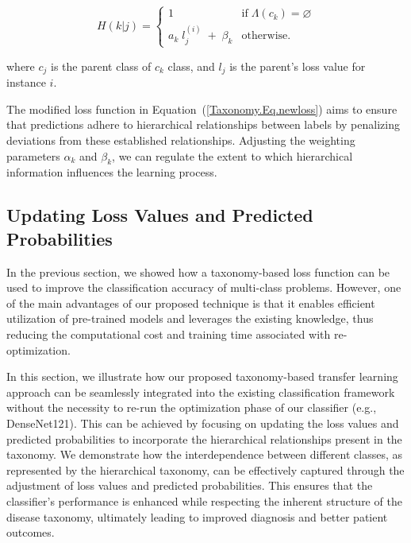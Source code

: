 \begin{equation}
    \label{Taxonomy.Eq.8.hierarchical_penalty.loss}
    H(k\vert j)=\left\{\begin{array}{lc}1&\text{if} \; \Lambda(c_k)=\varnothing\\a_k\;l_j^{(i)}\;+\;\beta_k&\text{otherwise.}\end{array}\right.
\end{equation}

where $c_j $ is the parent class of $c_k $ class, and $l_j $ is the parent's loss value for instance $i $.

The modified loss function in Equation~(\ref{Taxonomy.Eq.newloss})  aims to ensure that predictions adhere to hierarchical relationships between labels by penalizing deviations from these established relationships. Adjusting the weighting parameters $\alpha_k $ and $\beta_k $, we can regulate the extent to which hierarchical information influences the learning process.



\subsection{Updating Loss Values and Predicted Probabilities}

In the previous section, we showed how a taxonomy-based loss function can be used to improve the classification accuracy of multi-class problems. However, one of the main advantages of our proposed technique is that it enables efficient utilization of pre-trained models and leverages the existing knowledge, thus reducing the computational cost and training time associated with re-optimization.

In this section, we illustrate how our proposed taxonomy-based transfer learning approach can be seamlessly integrated into the existing classification framework without the necessity to re-run the optimization phase of our classifier (e.g., DenseNet121). This can be achieved by focusing on updating the loss values and predicted probabilities to incorporate the hierarchical relationships present in the taxonomy. We demonstrate how the interdependence between different classes, as represented by the hierarchical taxonomy, can be effectively captured through the adjustment of loss values and predicted probabilities. This ensures that the classifier's performance is enhanced while respecting the inherent structure of the disease taxonomy, ultimately leading to improved diagnosis and better patient outcomes.

